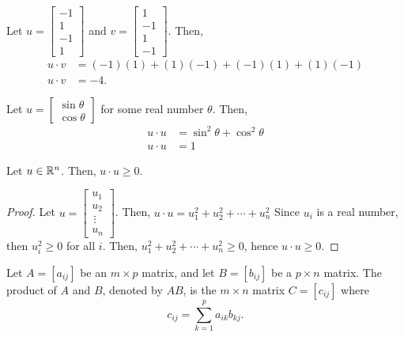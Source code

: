    \begin{example}
        Let \(u = \begin{bmatrix}
            -1 \\ 1 \\ -1 \\ 1
        \end{bmatrix}\) and \(v = \begin{bmatrix}
            1 \\ -1 \\ 1 \\ -1
        \end{bmatrix}\). Then,
        \begin{align*}
            u \cdot v &= (-1)(1) + (1)(-1) + (-1)(1) + (1)(-1) \\
            u \cdot v &= -4.
        \end{align*}
    \end{example}

    \begin{example}
        Let \(u = \begin{bmatrix}
            \sin\theta \\ \cos\theta
        \end{bmatrix}\) for some real number \(\theta\). Then,
        \begin{align*}
            u \cdot u &= \sin^2\theta + \cos^2\theta \\
            u \cdot u &= 1
        \end{align*}
    \end{example}

    \begin{thm}
        Let \(u \in \mathbb{R}^n\). Then, \(u \cdot u \geq 0\).
    \end{thm}

    \begin{proof}
        Let \(u = \begin{bmatrix}
            u_1 \\ u_2 \\ \,\vdots \\ u_n
        \end{bmatrix}\). Then, \(u \cdot u = u_1^2 + u_2^2 + \cdots + u_n^2\)
        Since \(u_i\) is a real number, then \(u_i^2 \geq 0\) for all \(i\). Then, \(u_1^2 + u_2^2 + \cdots + u_n^2 \geq 0\), hence \(u \cdot u \geq 0\).
    \end{proof}

    \begin{dfn}
        Let \(A = [a_{ij}]\) be an \(m \times p\) matrix, and let \(B = [b_{ij}]\) be a \(p \times n\) matrix. The product of \(A\) and \(B\), denoted by \(AB\), is the \(m \times n\) matrix \(C = [c_{ij}]\) where \[c_{ij} = \sum_{k = 1}^p a_{ik}b_{kj}.\]
    \end{dfn}

